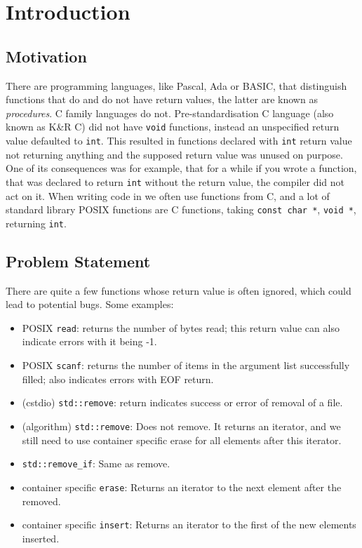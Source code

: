 \chapter{Introduction}
\label{ch:intro}

\section{Motivation}

There are programming languages, like Pascal, Ada or BASIC, that distinguish functions that do and do not
have return values,
the latter are known as \emph{procedures}. C family languages do not. Pre-standardisation C language (also known as K\&R C) \cite{kandr}
did not have \lstinline{void} functions,
instead an unspecified return value defaulted to \lstinline{int}. This resulted in functions declared with \lstinline{int} return value
not returning anything and the supposed return value was unused on purpose. One of its consequences was for example, that for a while if
you wrote a function, that was declared to return \lstinline{int} without the return value, the compiler did not act on it. When writing
code in \CC{} we often use functions from C, and a lot of standard library POSIX functions are C functions, taking \lstinline{const char *},
\lstinline{void *}, returning \lstinline{int}.

\section{Problem Statement}
\label{sec:prob state}

There are quite a few functions whose return value is often ignored, which could lead to potential bugs. Some examples:

\begin{itemize}
	\item POSIX \texttt{read}: returns the number of bytes read; this return value can also indicate errors with it being -1.
	\item POSIX \texttt{scanf}: returns the number of items in the argument list successfully filled; also indicates errors with EOF return.
	\item (cstdio) \texttt{std::remove}: return indicates success or error of removal of a file.
    \item (algorithm) \texttt{std::remove}: Does not remove. It returns an iterator, and we still need to use container specific erase
    for all elements after this iterator.
	\item \texttt{std::remove\_if}: Same as remove.
	\item container specific \texttt{erase}: Returns an iterator to the next element after the removed. 
	\item container specific \texttt{insert}: Returns an iterator to the first of the new elements inserted.
\end{itemize}


